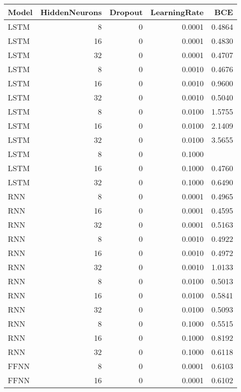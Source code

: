 \begin{table}[h!]
\centering
 \begin{adjustbox}{max width=\textwidth}
\begin{tabular}{lrrrr}
  \hline
Model & HiddenNeurons & Dropout & LearningRate & BCE \\ 
  \hline
LSTM &     8 &     0 & 0.0001 & 0.4864 \\ 
  LSTM &    16 &     0 & 0.0001 & 0.4830 \\ 
  LSTM &    32 &     0 & 0.0001 & 0.4707 \\ 
  LSTM &     8 &     0 & 0.0010 & 0.4676 \\ 
  LSTM &    16 &     0 & 0.0010 & 0.9600 \\ 
  LSTM &    32 &     0 & 0.0010 & 0.5040 \\ 
  LSTM &     8 &     0 & 0.0100 & 1.5755 \\ 
  LSTM &    16 &     0 & 0.0100 & 2.1409 \\ 
  LSTM &    32 &     0 & 0.0100 & 3.5655 \\ 
  LSTM &     8 &     0 & 0.1000 &  \\ 
  LSTM &    16 &     0 & 0.1000 & 0.4760 \\ 
  LSTM &    32 &     0 & 0.1000 & 0.6490 \\ 
  RNN &     8 &     0 & 0.0001 & 0.4965 \\ 
  RNN &    16 &     0 & 0.0001 & 0.4595 \\ 
  RNN &    32 &     0 & 0.0001 & 0.5163 \\ 
  RNN &     8 &     0 & 0.0010 & 0.4922 \\ 
  RNN &    16 &     0 & 0.0010 & 0.4972 \\ 
  RNN &    32 &     0 & 0.0010 & 1.0133 \\ 
  RNN &     8 &     0 & 0.0100 & 0.5013 \\ 
  RNN &    16 &     0 & 0.0100 & 0.5841 \\ 
  RNN &    32 &     0 & 0.0100 & 0.5093 \\ 
  RNN &     8 &     0 & 0.1000 & 0.5515 \\ 
  RNN &    16 &     0 & 0.1000 & 0.8192 \\ 
  RNN &    32 &     0 & 0.1000 & 0.6118 \\ 
  FFNN &     8 &     0 & 0.0001 & 0.6103 \\ 
  FFNN &    16 &     0 & 0.0001 & 0.6102 \\ 

\end{tabular}
\end{adjustbox}
\end{table}
